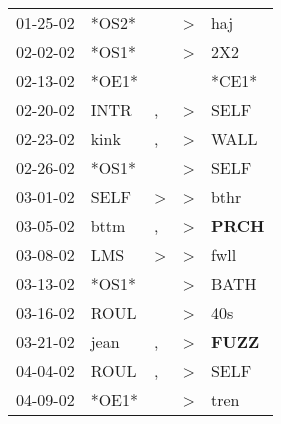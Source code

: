 \begin{supertabular}{p{0.07\textwidth}p{0.06\textwidth}p{0.02\textwidth}p{0.02\textwidth}p{0.06\textwidth}}
          01-25-02\textsuperscript{} &                            *OS2* &                  &     \textgreater &            haj\textsuperscript{} \\
          02-02-02\textsuperscript{} &                            *OS1* &                  &     \textgreater &            2X2\textsuperscript{} \\
          02-13-02\textsuperscript{} &                            *OE1* &                  &                  &                            *CE1* \\
          02-20-02\textsuperscript{} &           INTR\textsuperscript{} &                , &     \textgreater &           SELF\textsuperscript{} \\
          02-23-02\textsuperscript{} &           kink\textsuperscript{} &                , &     \textgreater &           WALL\textsuperscript{} \\
          02-26-02\textsuperscript{} &                            *OS1* &                  &     \textgreater &           SELF\textsuperscript{} \\
          03-01-02\textsuperscript{} &           SELF\textsuperscript{} &     \textgreater &     \textgreater &           bthr\textsuperscript{} \\
          03-05-02\textsuperscript{} &           bttm\textsuperscript{} &                , &     \textgreater &  \textbf{PRCH\textsuperscript{}} \\
          03-08-02\textsuperscript{} &            LMS\textsuperscript{} &     \textgreater &     \textgreater &           fwll\textsuperscript{} \\
          03-13-02\textsuperscript{} &                            *OS1* &                  &     \textgreater &           BATH\textsuperscript{} \\
          03-16-02\textsuperscript{} &           ROUL\textsuperscript{} &                  &     \textgreater &            40s\textsuperscript{} \\
          03-21-02\textsuperscript{} &           jean\textsuperscript{} &                , &     \textgreater &  \textbf{FUZZ\textsuperscript{}} \\
          04-04-02\textsuperscript{} &           ROUL\textsuperscript{} &                , &     \textgreater &           SELF\textsuperscript{} \\
          04-09-02\textsuperscript{} &                            *OE1* &                  &     \textgreater &           tren\textsuperscript{} \\

\end{supertabular}
